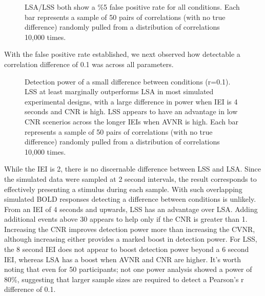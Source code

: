 \documentclass[10pt,letterpaper]{article}
\begin{document}
\begin{figure}[H]
  \centering


  \caption{
    LSA/LSS both show a \%5 false positive rate for all conditions.
    Each bar represents a sample of 50 pairs of correlations (with no true difference)
    randomly pulled from a distribution of correlations 10,000 times.
  }
  \label{fig:res_sim_fpr}
\end{figure}

With the false positive rate established, we next observed how detectable a
correlation difference of 0.1 was across all parameters.

\begin{figure}[H]
  \centering


  \caption{
    Detection power of a small difference between conditions (r=0.1).
    LSS at least marginally outperforms LSA in most simulated experimental
    designs, with a large difference in power when IEI is 4 seconds and
    CNR is high.
    LSS appears to have an advantage in low CNR scenerios across the longer IEIs
    when AVNR is high.
    Each bar represents a sample of 50 pairs of correlations (with no true difference)
    randomly pulled from a distribution of correlations 10,000 times.
  }
  \label{fig:res_sim_smalldiff}
\end{figure}

While the IEI is 2, there is no discernable difference between LSS and LSA.
Since the simulated data were sampled at 2 second intervals, the result
corresponds to effectively presenting a stimulus during each sample.
With such overlapping simulated BOLD responses detecting a difference between conditions
is unlikely.
From an IEI of 4 seconds and upwards, LSS has an advantage over LSA.
Adding additional events above 30 appears to help only if the CNR is greater than 1.
Increasing the CNR improves detection power more than increasing the CVNR, although increasing either
provides a marked boost in detection power.
For LSS, the 8 second IEI does not appear to boost detection power beyond a 6 second IEI,
whereas LSA has a boost when AVNR and CNR are higher.
It's worth noting that even for 50 participants; not one power analysis showed
a power of 80\%, suggesting that larger sample sizes are required to detect a Pearson's r
difference of 0.1.
\end{document}
